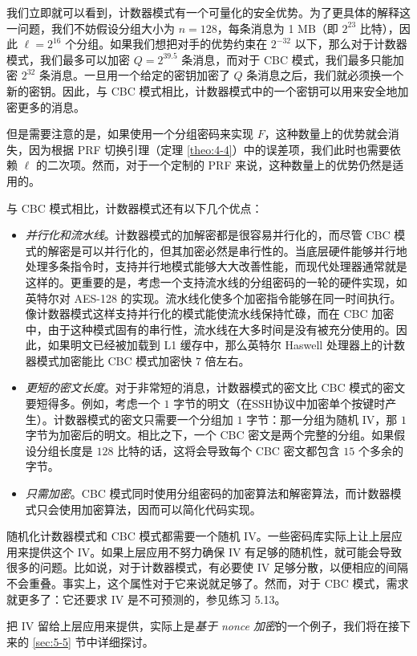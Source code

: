 我们立即就可以看到，计数器模式有一个可量化的安全优势。为了更具体的解释这一问题，我们不妨假设分组大小为 $n=128$，每条消息为 1 MB（即 $2^{23}$ 比特），因此 $\ell=2^{16}$ 个分组。如果我们想把对手的优势约束在 $2^{-32}$ 以下，那么对于计数器模式，我们最多可以加密 $Q=2^{39.5}$ 条消息，而对于 CBC 模式，我们最多只能加密 $2^{32}$ 条消息。一旦用一个给定的密钥加密了 $Q$ 条消息之后，我们就必须换一个新的密钥。因此，与 CBC 模式相比，计数器模式中的一个密钥可以用来安全地加密更多的消息。

但是需要注意的是，如果使用一个分组密码来实现 $F$，这种数量上的优势就会消失，因为根据 PRF 切换引理（定理 \ref{theo:4-4}）中的误差项，我们此时也需要依赖 $\ell$ 的二次项。然而，对于一个定制的 PRF 来说，这种数量上的优势仍然是适用的。

与 CBC 模式相比，计数器模式还有以下几个优点：
\begin{itemize}
	\item \emph{并行化和流水线}。计数器模式的加解密都是很容易并行化的，而尽管 CBC 模式的解密是可以并行化的，但其加密必然是串行性的。当底层硬件能够并行地处理多条指令时，支持并行地模式能够大大改善性能，而现代处理器通常就是这样的。更重要的是，考虑一个支持流水线的分组密码的一轮的硬件实现，如英特尔对 AES-128 的实现。流水线化使多个加密指令能够在同一时间执行。像计数器模式这样支持并行化的模式能使流水线保持忙碌，而在 CBC 加密中，由于这种模式固有的串行性，流水线在大多时间是没有被充分使用的。因此，如果明文已经被加载到 L1 缓存中，那么英特尔 Haswell 处理器上的计数器模式加密能比 CBC 模式加密快 $7$ 倍左右。
	\item \emph{更短的密文长度}。对于非常短的消息，计数器模式的密文比 CBC 模式的密文要短得多。例如，考虑一个 $1$ 字节的明文（在SSH协议中加密单个按键时产生）。计数器模式的密文只需要一个分组加 $1$ 字节：那一分组为随机 IV，那 $1$ 字节为加密后的明文。相比之下，一个 CBC 密文是两个完整的分组。如果假设分组长度是 $128$ 比特的话，这将会导致每个 CBC 密文都包含 $15$ 个多余的字节。
	\item \emph{只需加密}。CBC 模式同时使用分组密码的加密算法和解密算法，而计数器模式只会使用加密算法，因而可以简化代码实现。
\end{itemize}

\begin{remark}\label{remark:5-4}
随机化计数器模式和 CBC 模式都需要一个随机 IV。一些密码库实际上让上层应用来提供这个 IV。如果上层应用不努力确保 IV 有足够的随机性，就可能会导致很多的问题。比如说，对于计数器模式，有必要使 IV 足够分散，以便相应的间隔不会重叠。事实上，这个属性对于它来说就足够了。然而，对于 CBC 模式，需求就更多了：它还要求 IV 是不可预测的，参见练习 5.13。

把 IV 留给上层应用来提供，实际上是\emph{基于 nonce 加密}的一个例子，我们将在接下来的 \ref{sec:5-5} 节中详细探讨。
\end{remark}